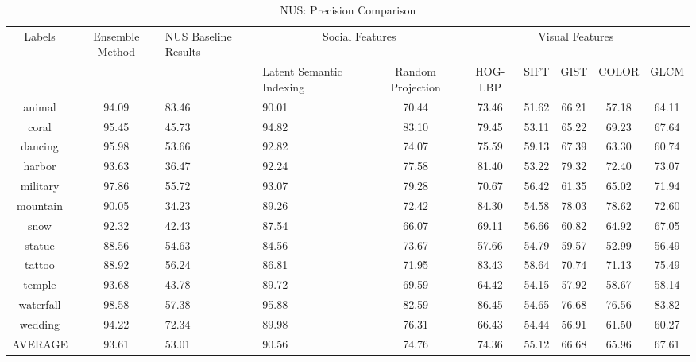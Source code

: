\newpage
\begin{sidewaystable}
\caption{ NUS: Precision Comparison} %
\vspace*{0.2 cm}
\begin{tabular}{|c|c| p{2cm}| p{2cm}|c|c|c|c|c|c|} %
Labels  & Ensemble Method  &  NUS Baseline Results & \multicolumn{2}{c}{Social Features}  & \multicolumn{5}{c}{Visual Features}\\ [0.5ex] 
 &  & & Latent Semantic Indexing & Random Projection & HOG-LBP & SIFT & GIST & COLOR & GLCM \\  [1ex] \hline
animal & 94.09 & 83.46 & 90.01 & 70.44 & 73.46 & 51.62 & 66.21 & 57.18 & 64.11 \\  [1ex]
coral & 95.45 & 45.73 & 94.82 & 83.10 & 79.45 & 53.11 & 65.22 & 69.23 & 67.64 \\  [1ex]
dancing & 95.98 & 53.66 & 92.82 & 74.07 & 75.59 & 59.13 & 67.39 & 63.30 & 60.74 \\  [1ex]
harbor & 93.63 & 36.47 & 92.24 & 77.58 & 81.40 & 53.22 & 79.32 & 72.40 & 73.07 \\  [1ex]
military & 97.86 & 55.72 & 93.07 & 79.28 & 70.67 & 56.42 & 61.35 & 65.02 & 71.94 \\  [1ex]
mountain & 90.05 & 34.23 & 89.26 & 72.42 & 84.30 & 54.58 & 78.03 & 78.62 & 72.60 \\  [1ex]
snow & 92.32 & 42.43 & 87.54 & 66.07 & 69.11 & 56.66 & 60.82 & 64.92 & 67.05 \\  [1ex]
statue & 88.56 & 54.63 & 84.56 & 73.67 & 57.66 & 54.79 & 59.57 & 52.99 & 56.49 \\  [1ex]
tattoo & 88.92 & 56.24 & 86.81 & 71.95 & 83.43 & 58.64 & 70.74 & 71.13 & 75.49 \\  [1ex]
temple & 93.68 & 43.78 & 89.72 & 69.59 & 64.42 & 54.15 & 57.92 & 58.67 & 58.14 \\  [1ex]
waterfall & 98.58 & 57.38 & 95.88 & 82.59 & 86.45 & 54.65 & 76.68 & 76.56 & 83.82 \\  [1ex]
wedding & 94.22 & 72.34 & 89.98 & 76.31 & 66.43 & 54.44 & 56.91 & 61.50 & 60.27 \\  [1ex] \hline
AVERAGE & 93.61 & 53.01 & 90.56 & 74.76 & 74.36 & 55.12 & 66.68 & 65.96 & 67.61 \\  [1ex] \hline
  
\end{tabular}
\label{table:NUSPrecision} %
\end{sidewaystable}


